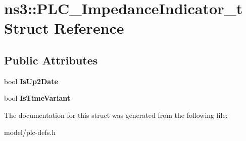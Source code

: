 \hypertarget{structns3_1_1PLC__ImpedanceIndicator__t}{\section{ns3\-:\-:\-P\-L\-C\-\_\-\-Impedance\-Indicator\-\_\-t \-Struct \-Reference}
\label{structns3_1_1PLC__ImpedanceIndicator__t}
}
\subsection*{\-Public \-Attributes}
\begin{DoxyCompactItemize}
\item 
\hypertarget{structns3_1_1PLC__ImpedanceIndicator__t_a0fff84f807082989bf302f3c444ecc4d}{bool {\bfseries \-Is\-Up2\-Date}}\label{structns3_1_1PLC__ImpedanceIndicator__t_a0fff84f807082989bf302f3c444ecc4d}

\item 
\hypertarget{structns3_1_1PLC__ImpedanceIndicator__t_ae8dfc52f535fefa24f633516db500cda}{bool {\bfseries \-Is\-Time\-Variant}}\label{structns3_1_1PLC__ImpedanceIndicator__t_ae8dfc52f535fefa24f633516db500cda}

\end{DoxyCompactItemize}


\-The documentation for this struct was generated from the following file\-:\begin{DoxyCompactItemize}
\item 
model/plc-\/defs.\-h\end{DoxyCompactItemize}
